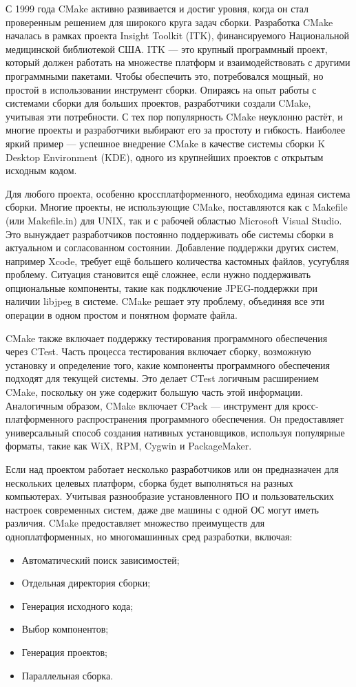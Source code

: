 С 1999 года CMake активно развивается и достиг уровня, когда он стал проверенным решением для широкого круга задач сборки. Разработка CMake началась в рамках проекта Insight Toolkit (ITK), финансируемого Национальной медицинской библиотекой США. ITK — это крупный программный проект, который должен работать на множестве платформ и взаимодействовать с другими программными пакетами. Чтобы обеспечить это, потребовался мощный, но простой в использовании инструмент сборки. Опираясь на опыт работы с системами сборки для больших проектов, разработчики создали CMake, учитывая эти потребности. С тех пор популярность CMake неуклонно растёт, и многие проекты и разработчики выбирают его за простоту и гибкость. Наиболее яркий пример — успешное внедрение CMake в качестве системы сборки K Desktop Environment (KDE), одного из крупнейших проектов с открытым исходным кодом.

Для любого проекта, особенно кроссплатформенного, необходима единая система сборки. Многие проекты, не использующие CMake, поставляются как с Makefile (или Makefile.in) для UNIX, так и с рабочей областью Microsoft Visual Studio. Это вынуждает разработчиков постоянно поддерживать обе системы сборки в актуальном и согласованном состоянии. Добавление поддержки других систем, например Xcode, требует ещё большего количества кастомных файлов, усугубляя проблему. Ситуация становится ещё сложнее, если нужно поддерживать опциональные компоненты, такие как подключение JPEG-поддержки при наличии libjpeg в системе. CMake решает эту проблему, объединяя все эти операции в одном простом и понятном формате файла.

CMake также включает поддержку тестирования программного обеспечения через CTest. Часть процесса тестирования включает сборку, возможную установку и определение того, какие компоненты программного обеспечения подходят для текущей системы. Это делает CTest логичным расширением CMake, поскольку он уже содержит большую часть этой информации. Аналогичным образом, CMake включает CPack — инструмент для кросс-платформенного распространения программного обеспечения. Он предоставляет универсальный способ создания нативных установщиков, используя популярные форматы, такие как WiX, RPM, Cygwin и PackageMaker.

Если над проектом работает несколько разработчиков или он предназначен для нескольких целевых платформ, сборка будет выполняться на разных компьютерах. Учитывая разнообразие установленного ПО и пользовательских настроек современных систем, даже две машины с одной ОС могут иметь различия. CMake предоставляет множество преимуществ для одноплатформенных, но многомашинных сред разработки, включая:
\begin{itemize}
	\item Автоматический поиск зависимостей;
	\item Отдельная директория сборки;
	\item Генерация исходного кода;
	\item Выбор компонентов;
	\item Генерация проектов;
	\item Параллельная сборка.
\end{itemize}

